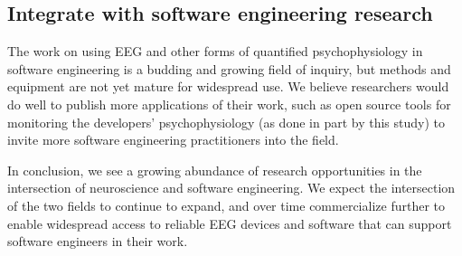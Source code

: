 \subsection{Integrate with software engineering research}

The work on using EEG and other forms of quantified psychophysiology in software engineering is a budding and growing field of inquiry, but methods and equipment are not yet mature for widespread use. We believe researchers would do well to publish more applications of their work, such as open source tools for monitoring the developers' psychophysiology (as done in part by this study) to invite more software engineering practitioners into the field.


In conclusion, we see a growing abundance of research opportunities in the intersection of neuroscience and software engineering. We expect the intersection of the two fields to continue to expand, and over time commercialize further to enable widespread access to reliable EEG devices and software that can support software engineers in their work.
